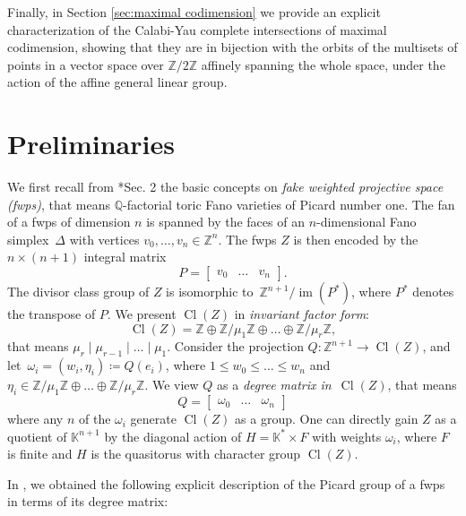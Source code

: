 \documentclass{amsart}
\DeclareMathOperator{\im}{im}
\DeclareMathOperator{\Cl}{Cl}
\newcommand{\Z}{\mathbb{Z}}
\newcommand{\Q}{\mathbb{Q}}
\newcommand{\K}{\mathbb{K}}
\theoremstyle{definition}
\begin{document}
Finally, in Section \ref{sec:maximal codimension} we provide an explicit characterization of the Calabi-Yau complete intersections of maximal codimension, showing that they are in bijection with the orbits of the multisets of points in a vector space over $\Z/2\Z$ affinely spanning the whole space, under the action of the affine general linear group.

\section{Preliminaries}\label{sec:preliminaries}

We first recall from \cite{HHHS}*{Sec. 2} the basic concepts on \emph{fake weighted projective space (fwps)}, that means $\Q$-factorial toric Fano varieties of Picard number one. The fan of a fwps of dimension $n$ is spanned by the faces of an $n$-dimensional Fano simplex~$\Delta$ with vertices $v_0,\dots,v_n\in\Z^{n}$. The fwps $Z$ is then encoded by the~$n\times (n+1)$ integral matrix
$$
P=\begin{bmatrix}
  v_0 & \dots & v_n  
\end{bmatrix}.
$$
The divisor class group of $Z$ is isomorphic to~$\Z^{n+1}/\im(P^*)$, where $P^*$ denotes the transpose of $P$. We present $\Cl(Z)$ in \emph{invariant factor form}:
$$\Cl(Z)=\Z\oplus \Z/\mu_1\Z\oplus\dots\oplus\Z/\mu_r\Z,$$
that means $\mu_r \mid \mu_{r-1} \mid \dots \mid \mu_1$.
Consider the projection $Q\colon \Z^{n+1}\rightarrow\Cl(Z)$, and let~$\omega_i=(w_i,\eta_i)\coloneqq Q(e_i)$, where $1\leq w_0\leq\dots\leq w_n$ and $\eta_i\in\Z/\mu_1\Z\oplus\dots\oplus\Z/\mu_r\Z$. We view $Q$ as a \emph{degree matrix in}~$\Cl(Z)$, that means
$$
Q=\begin{bmatrix}
    \omega_0 & \dots &\omega_n
\end{bmatrix}
$$
where any $n$ of the $\omega_i$ generate $\Cl(Z)$ as a group.
One can directly gain $Z$ as a quotient of $\K^{n+1}$ by the diagonal action of $H=\K^*\times F$ with weights $\omega_i$, where $F$ is finite and $H$ is the quasitorus with character group $\Cl(Z)$.

In \cite{Ghi}, we obtained the following explicit description of the Picard group of a fwps in terms of its degree matrix:
\end{document}
